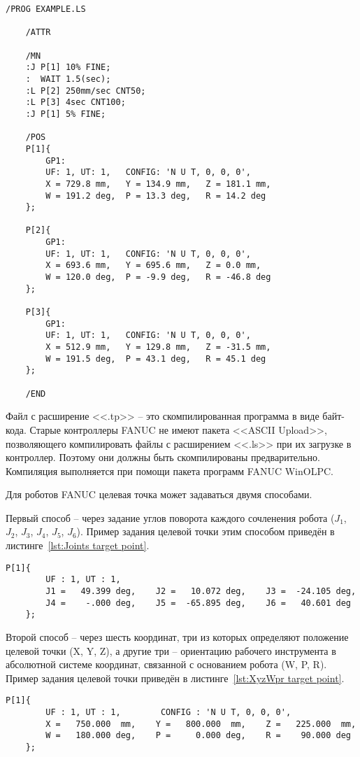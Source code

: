 \begin{lstlisting}[caption={Пример оформления .LS файлов}, label={lst:LS example}]
	/PROG EXAMPLE.LS

	/ATTR

	/MN
	:J P[1] 10% FINE;
	:  WAIT 1.5(sec);
	:L P[2] 250mm/sec CNT50;
	:L P[3] 4sec CNT100;
	:J P[1] 5% FINE;

	/POS
	P[1]{
		GP1:
		UF: 1, UT: 1,	CONFIG: 'N U T, 0, 0, 0',
		X = 729.8 mm,	Y = 134.9 mm,	Z = 181.1 mm,
		W = 191.2 deg,	P = 13.3 deg,	R = 14.2 deg
	};

	P[2]{
		GP1:
		UF: 1, UT: 1,	CONFIG: 'N U T, 0, 0, 0',
		X = 693.6 mm,	Y = 695.6 mm,	Z = 0.0 mm,
		W = 120.0 deg,	P = -9.9 deg,	R = -46.8 deg
	};

	P[3]{
		GP1:
		UF: 1, UT: 1,	CONFIG: 'N U T, 0, 0, 0',
		X = 512.9 mm,	Y = 129.8 mm,	Z = -31.5 mm,
		W = 191.5 deg,	P = 43.1 deg,	R = 45.1 deg
	};

	/END
\end{lstlisting}

Файл с расширение <<.tp>> -- это скомпилированная программа в виде байт-кода.
Старые контроллеры FANUC не имеют пакета <<ASCII Upload>>, позволяющего компилировать файлы с расширением <<.ls>> при их загрузке в контроллер.
Поэтому они должны быть скомпилированы предварительно.
Компиляция выполняется при помощи пакета программ FANUC WinOLPC.

Для роботов FANUC целевая точка может задаваться двумя способами.

Первый способ -- через задание углов поворота каждого сочленения робота ($J_1$, $J_2$, $J_3$, $J_4$, $J_5$, $J_6$).
Пример задания целевой точки этим способом приведён в листинге~\ref{lst:Joints target point}.

\begin{lstlisting}[caption={Задание целевой точки с помощью углов J1-J6}, label={lst:Joints target point}]
	P[1]{
		UF : 1, UT : 1,
		J1 =   49.399 deg,    J2 =   10.072 deg,    J3 =  -24.105 deg,
		J4 =    -.000 deg,    J5 =  -65.895 deg,    J6 =   40.601 deg
	};
\end{lstlisting}

Второй способ -- через шесть координат, три из которых определяют положение целевой точки (X, Y, Z), а другие три -- ориентацию рабочего инструмента в абсолютной системе координат, связанной с основанием робота (W, P, R).
Пример задания целевой точки приведён в листинге~\ref{lst:XyzWpr target point}.

\begin{lstlisting}[caption={Задание целевой точки с помощью координат XYZWPR}, label={lst:XyzWpr target point}]
	P[1]{
		UF : 1, UT : 1,        CONFIG : 'N U T, 0, 0, 0',
		X =   750.000  mm,    Y =   800.000  mm,    Z =   225.000  mm,
		W =   180.000 deg,    P =     0.000 deg,    R =    90.000 deg
	};
\end{lstlisting}

